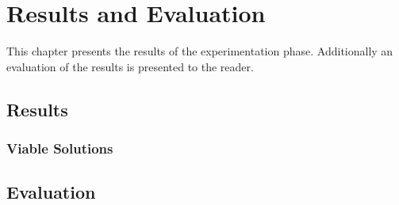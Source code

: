 \part{Results and Evaluation}

This chapter presents the results of the experimentation phase.
Additionally an evaluation of the results is presented to the reader.

\chapter{Results}

\section{Viable Solutions}

\chapter{Evaluation}

